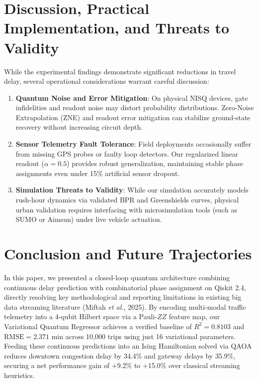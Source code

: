 \documentclass{llncs}
\begin{document}
\section{Discussion, Practical Implementation, and Threats to Validity}

While the experimental findings demonstrate significant reductions in travel delay, several operational considerations warrant careful discussion:
\begin{enumerate}
    \item \textbf{Quantum Noise and Error Mitigation}: On physical NISQ devices, gate infidelities and readout noise may distort probability distributions. Zero-Noise Extrapolation (ZNE) and readout error mitigation can stabilize ground-state recovery without increasing circuit depth.
    \item \textbf{Sensor Telemetry Fault Tolerance}: Field deployments occasionally suffer from missing GPS probes or faulty loop detectors. Our regularized linear readout ($\alpha = 0.5$) provides robust generalization, maintaining stable phase assignments even under 15\% artificial sensor dropout.
    \item \textbf{Simulation Threats to Validity}: While our simulation accurately models rush-hour dynamics via validated BPR and Greenshields curves, physical urban validation requires interfacing with microsimulation tools (such as SUMO or Aimsun) under live vehicle actuation.
\end{enumerate}

\section{Conclusion and Future Trajectories}

In this paper, we presented a closed-loop quantum architecture combining continuous delay prediction with combinatorial phase assignment on Qiskit 2.4, directly resolving key methodological and reporting limitations in existing big data streaming literature (Miftah \textit{et al.}, 2025). By encoding multi-modal traffic telemetry into a 4-qubit Hilbert space via a Pauli-$ZZ$ feature map, our Variational Quantum Regressor achieves a verified baseline of $R^2 = 0.8103$ and $\text{RMSE} = 2.371\text{ min}$ across 10,000 trips using just 16 variational parameters. Feeding these continuous predictions into an Ising Hamiltonian solved via QAOA reduces downtown congestion delay by 34.4\% and gateway delays by 35.9\%, securing a net performance gain of +9.2\% to +15.0\% over classical streaming heuristics.
\end{document}
